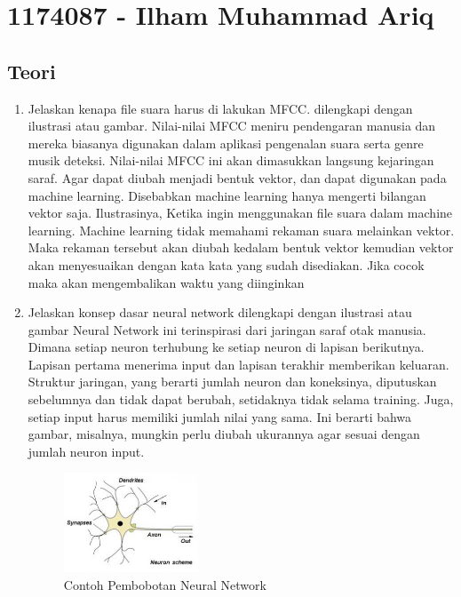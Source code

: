 \section{1174087 - Ilham Muhammad Ariq}
\subsection{Teori}
\begin{enumerate}
	\item Jelaskan kenapa ﬁle suara harus di lakukan MFCC. dilengkapi dengan ilustrasi atau gambar.
	\hfill\break
	Nilai-nilai MFCC meniru pendengaran manusia dan mereka biasanya digunakan dalam aplikasi pengenalan suara serta genre musik deteksi. Nilai-nilai MFCC ini akan dimasukkan langsung kejaringan saraf. Agar dapat diubah menjadi bentuk vektor, dan dapat digunakan pada machine learning. Disebabkan machine learning hanya mengerti bilangan vektor saja. 
	\hfill\break
	Ilustrasinya, Ketika ingin menggunakan file suara dalam machine learning. Machine learning tidak memahami rekaman suara melainkan vektor. Maka rekaman tersebut akan diubah kedalam bentuk vektor kemudian vektor akan menyesuaikan dengan kata kata yang sudah disediakan. Jika cocok maka akan mengembalikan waktu yang diinginkan
	
	\item Jelaskan konsep dasar neural network dilengkapi dengan ilustrasi atau gambar
	\hfill\break
	Neural Network ini terinspirasi dari jaringan saraf otak manusia. Dimana setiap neuron terhubung ke setiap neuron di lapisan berikutnya. Lapisan pertama menerima input dan lapisan terakhir memberikan keluaran. Struktur jaringan, yang berarti jumlah neuron dan koneksinya, diputuskan sebelumnya dan tidak dapat berubah, setidaknya tidak selama training. Juga, setiap input harus memiliki jumlah nilai yang sama. Ini berarti bahwa gambar, misalnya, mungkin perlu diubah ukurannya agar sesuai dengan jumlah neuron input.
	\begin{figure}[H]
		\includegraphics[width=4cm]{figures/1174087/6/1.png}
		\centering
		\caption{Contoh Pembobotan Neural Network}
	\end{figure}


\end{enumerate}
